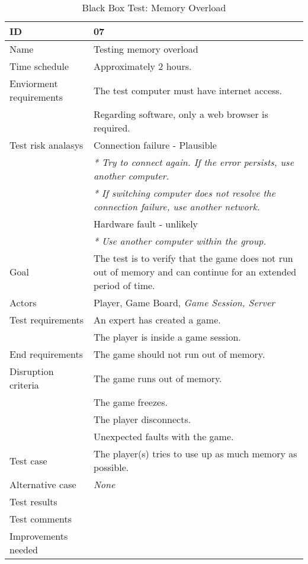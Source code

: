 {\footnotesize
\begin{table}[H]
\begin{tabular}{| p{5cm} | p{10cm} |}\hline
	\textbf{ID}	& \textbf{07} \\ \hline
	Name		& Testing memory overload\\ \hline
	Time schedule	& Approximately 2 hours.\\ \hline
	Enviorment requirements 
		& The test computer must have internet access. \\
		& Regarding software, only a web browser is required. \\ \hline
	Test risk analasys 
		& Connection failure - Plausible \\
		& \emph{* Try to connect again. If the error persists, use another computer.} \\
		& \emph{* If switching computer does not resolve the connection failure, use another network.}\\ 
		& Hardware fault - unlikely \\
		& \emph{* Use another computer within the group.} \\ \hline
	Goal	& The test is to verify that the game does not run out of memory and can continue for an extended period of time. \\ \hline
	Actors	& Player, Game Board, \emph{Game Session, Server} \\ \hline
	Test requirements
		& An expert has created a game.\\
		& The player is inside a game session.\\ \hline
	End requirements 
		& The game should not run out of memory.\\ \hline
	Disruption criteria 
		& The game runs out of memory. \\
		& The game freezes. \\
		& The player disconnects.\\
		& Unexpected faults with the game.\\ \hline
	Test case
		& The player(s) tries to use up as much memory as possible.\\ \hline
	Alternative case
		& \emph{None}\\ \hline
	Test results 
		& \\ \hline
	Test comments
		& \\ \hline
	Improvements needed
		& \\ \hline
\end{tabular}


\caption{Black Box Test: Memory Overload}
\label{fig:black_box_test_7}
\end{table}}


